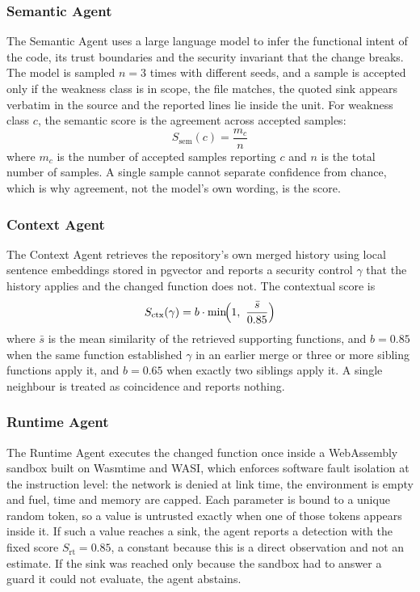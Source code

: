 \documentclass[conference]{IEEEtran}
\begin{document}
\subsubsection{Semantic Agent}
The Semantic Agent uses a large language model to infer the functional
intent of the code, its trust boundaries and the security invariant that
the change breaks. The model is sampled $n=3$ times with different seeds,
and a sample is accepted only if the weakness class is in scope, the file
matches, the quoted sink appears verbatim in the source and the reported
lines lie inside the unit. For weakness class $c$, the semantic score is
the agreement across accepted samples:
\begin{equation}
S_{\mathrm{sem}}(c)=\frac{m_c}{n}
\label{eq:sem}
\end{equation}
where $m_c$ is the number of accepted samples reporting $c$ and $n$ is the
total number of samples. A single sample cannot separate confidence from
chance, which is why agreement, not the model's own wording, is the score.

\subsubsection{Context Agent}
The Context Agent retrieves the repository's own merged history using local
sentence embeddings stored in pgvector and reports a security control
$\gamma$ that the history applies and the changed function does not. The
contextual score is
\begin{equation}
S_{\mathrm{ctx}}(\gamma)=b\cdot\min\!\Bigl(1,\ \frac{\bar{s}}{0.85}\Bigr)
\label{eq:ctx}
\end{equation}
where $\bar{s}$ is the mean similarity of the retrieved supporting
functions, and $b=0.85$ when the same function established $\gamma$ in an
earlier merge or three or more sibling functions apply it, and $b=0.65$
when exactly two siblings apply it. A single neighbour is treated as
coincidence and reports nothing.

\subsubsection{Runtime Agent}
The Runtime Agent executes the changed function once inside a WebAssembly
sandbox built on Wasmtime and WASI, which enforces software fault isolation
at the instruction level: the network is denied at link time, the
environment is empty and fuel, time and memory are capped. Each parameter
is bound to a unique random token, so a value is untrusted exactly when one
of those tokens appears inside it. If such a value reaches a sink, the
agent reports a detection with the fixed score $S_{\mathrm{rt}}=0.85$, a
constant because this is a direct observation and not an estimate. If the
sink was reached only because the sandbox had to answer a guard it could
not evaluate, the agent abstains.
\end{document}
